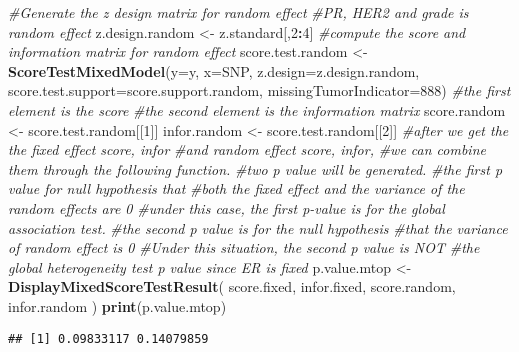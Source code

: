 \documentclass[11pt,]{article}
\newenvironment{Shaded}{\begin{snugshade}}{\end{snugshade}}
\newcommand{\CommentTok}[1]{\textcolor[rgb]{0.56,0.35,0.01}{\textit{#1}}}
\newcommand{\DataTypeTok}[1]{\textcolor[rgb]{0.13,0.29,0.53}{#1}}
\newcommand{\DecValTok}[1]{\textcolor[rgb]{0.00,0.00,0.81}{#1}}
\newcommand{\KeywordTok}[1]{\textcolor[rgb]{0.13,0.29,0.53}{\textbf{#1}}}
\newcommand{\NormalTok}[1]{#1}
\newcommand{\OperatorTok}[1]{\textcolor[rgb]{0.81,0.36,0.00}{\textbf{#1}}}
\newcommand{\StringTok}[1]{\textcolor[rgb]{0.31,0.60,0.02}{#1}}
\begin{document}
\begin{Shaded}
\begin{Highlighting}[]
\CommentTok{#Generate the z design matrix for random effect}
\CommentTok{#PR, HER2 and grade is random effect}
\NormalTok{z.design.random <-}\StringTok{ }\NormalTok{z.standard[,}\DecValTok{2}\OperatorTok{:}\DecValTok{4}\NormalTok{]}
\CommentTok{#compute the score and information matrix for random effect}
\NormalTok{score.test.random <-}\StringTok{ }\KeywordTok{ScoreTestMixedModel}\NormalTok{(}\DataTypeTok{y=}\NormalTok{y,}
                                         \DataTypeTok{x=}\NormalTok{SNP,}
                                         \DataTypeTok{z.design=}\NormalTok{z.design.random,}
                                         \DataTypeTok{score.test.support=}\NormalTok{score.support.random,}
                                         \DataTypeTok{missingTumorIndicator=}\DecValTok{888}\NormalTok{)}
\CommentTok{#the first element is the score}
\CommentTok{#the second element is the information matrix}
\NormalTok{score.random <-}\StringTok{ }\NormalTok{score.test.random[[}\DecValTok{1}\NormalTok{]]}
\NormalTok{infor.random <-}\StringTok{ }\NormalTok{score.test.random[[}\DecValTok{2}\NormalTok{]]}
\CommentTok{#after we get the the fixed effect score, infor }
\CommentTok{#and random effect score, infor, }
\CommentTok{#we can combine them through the following function. }
\CommentTok{#two p value will be generated.}
\CommentTok{#the first p value for null hypothesis that}
\CommentTok{#both the fixed effect and the variance of the random effects are 0}
\CommentTok{#under this case, the first p-value is for the global association test.}
\CommentTok{#the second p value is for the null hypothesis }
\CommentTok{#that the variance of random effect is 0}
\CommentTok{#Under this situation, the second p value is NOT }
\CommentTok{#the global heterogeneity test p value since ER is fixed}
\NormalTok{p.value.mtop <-}\StringTok{ }\KeywordTok{DisplayMixedScoreTestResult}\NormalTok{(}
\NormalTok{  score.fixed,}
\NormalTok{  infor.fixed,}
\NormalTok{  score.random,}
\NormalTok{  infor.random}
\NormalTok{)  }
\KeywordTok{print}\NormalTok{(p.value.mtop)}
\end{Highlighting}
\end{Shaded}

\begin{verbatim}
## [1] 0.09833117 0.14079859
\end{verbatim}
\end{document}
